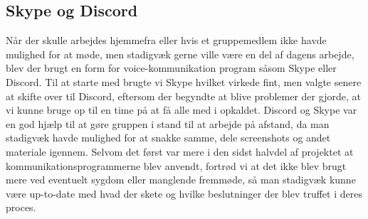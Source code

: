 \subsection*{Skype og Discord}\label{SkypeOgDiscord}
Når der skulle arbejdes hjemmefra eller hvis et gruppemedlem ikke havde mulighed for at møde, men stadigvæk gerne ville være en del af dagens arbejde, blev der brugt en form for voice-kommunikation program såsom Skype eller Discord. Til at starte med brugte vi Skype hvilket virkede fint, men valgte senere at skifte over til Discord, eftersom der begyndte at blive problemer der gjorde, at vi kunne bruge op til en time på at få alle med i opkaldet. Discord og Skype var en god hjælp til at gøre gruppen i stand til at arbejde på afstand, da man stadigvæk havde mulighed for at snakke samme, dele screenshots og andet materiale igennem. Selvom det først var mere i den sidst halvdel af projektet at kommunikationsprogrammerne blev anvendt, fortrød vi at det ikke blev brugt mere ved eventuelt sygdom eller manglende fremmøde, så man stadigvæk kunne være up-to-date med hvad der skete og hvilke beslutninger der blev truffet i deres proces.

